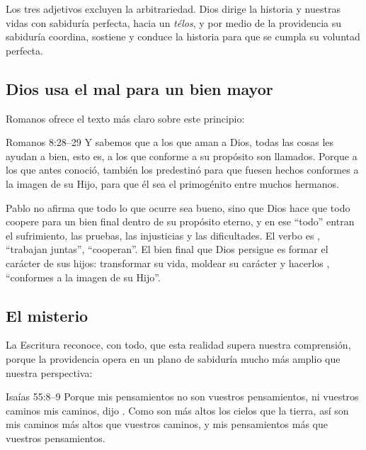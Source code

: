 Los tres adjetivos excluyen la arbitrariedad. Dios dirige la historia y nuestras vidas con sabiduría perfecta, hacia un \emph{télos}, y por medio de la providencia su sabiduría coordina, sostiene y conduce la historia para que se cumpla su voluntad perfecta.

\subsection{Dios usa el mal para un bien mayor}

Romanos ofrece el texto más claro sobre este principio:

\begin{verso}{Romanos 8:28–29}
Y sabemos que a los que aman a Dios, todas las cosas les ayudan a bien, esto es, a los que conforme a su propósito son llamados. Porque a los que antes conoció, también los predestinó para que fuesen hechos conformes a la imagen de su Hijo, para que él sea el primogénito entre muchos hermanos.
\end{verso}

Pablo no afirma que todo lo que ocurre sea bueno, sino que Dios hace que todo coopere para un bien final dentro de su propósito eterno, y en ese ``todo'' entran el sufrimiento, las pruebas, las injusticias y las dificultades. El verbo es , ``trabajan juntas'', ``cooperan''. El bien final que Dios persigue es formar el carácter de sus hijos: transformar su vida, moldear su carácter y hacerlos , ``conformes a la imagen de su Hijo''.


\subsection{El misterio}

La Escritura reconoce, con todo, que esta realidad supera nuestra comprensión, porque la providencia opera en un plano de sabiduría mucho más amplio que nuestra perspectiva:

\begin{verso}{Isaías 55:8–9}
Porque mis pensamientos no son vuestros pensamientos, ni vuestros caminos mis caminos, dijo \SENOR. Como son más altos los cielos que la tierra, así son mis caminos más altos que vuestros caminos, y mis pensamientos más que vuestros pensamientos.
\end{verso}

